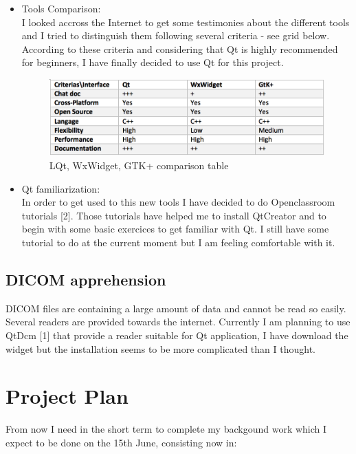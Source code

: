 \documentclass[12pt,twoside]{article}
\begin{document}
\begin{itemize} 
\item Tools Comparison: \\
I looked accross the Internet to get some testimonies about the different tools and I tried to distinguish them following several criteria - see grid below. 
According to these criteria and considering that Qt is highly recommended for beginners, I have finally decided to use Qt for this project.

\begin{figure}[ht]
\centering
\includegraphics[width = 0.99\hsize]{./figures/comparison}
\caption{LQt, WxWidget, GTK+ comparison table}
\end{figure}
 
\item Qt familiarization: \\
In order to get used to this new tools I have decided to do Openclassroom tutorials [2].
Those tutorials have helped me to install QtCreator and to begin with some basic exercices to get familiar with Qt. I still have some tutorial to do at the current moment but I am feeling comfortable with it.
 
	
\end{itemize}

\subsection{DICOM apprehension}
DICOM files are containing a large amount of data and cannot be read so easily. Several readers are provided towards the internet. Currently I am planning to use QtDcm [1] that provide a reader suitable for Qt application, I have download the widget but the installation seems to be more complicated than I thought.


\clearpage
\section{Project Plan}
From now I need in the short term to complete my backgound work which I expect to be done on the 15th June, consisting now in:
\end{document}
